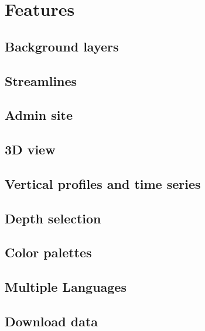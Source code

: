 \section{Features}
\label{sec:features}
\subsection{Background layers}
\subsection{Streamlines}
\subsection{Admin site}
\subsection{3D view}
\subsection{Vertical profiles and time series}

\subsection{Depth selection}
\subsection{Color palettes}
\subsection{Multiple Languages}
% 
\subsection{Download data}
% 
